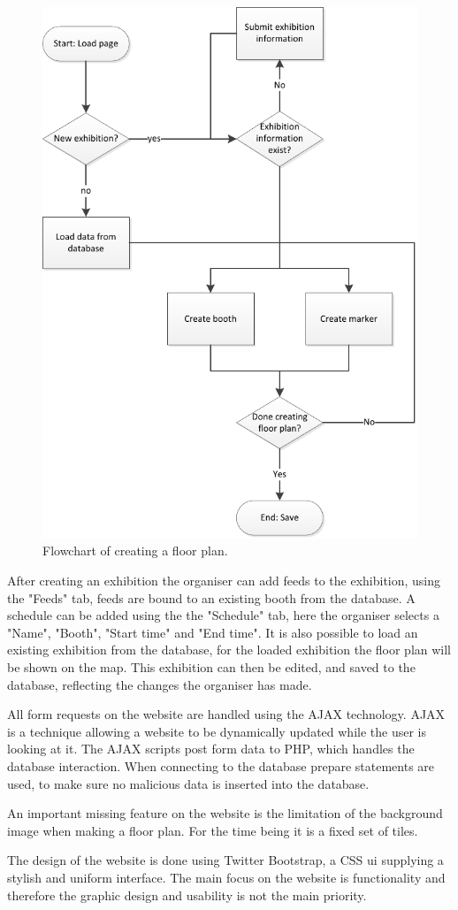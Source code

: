 \begin{figure}[H]
	\centering
	\includegraphics[width=0.7\linewidth]{img/floorplanflow.pdf}
	\caption{Flowchart of creating a floor plan.\label{fig:floorplan}}
\end{figure}

After creating an exhibition the organiser can add feeds to the exhibition, using the "Feeds" tab, feeds are bound to an existing booth from the database. A schedule can be added using the the "Schedule" tab, here the organiser selects a "Name", "Booth", "Start time" and "End time".
It is also possible to load an existing exhibition from the database, for the loaded exhibition the floor plan will be shown on the map. This exhibition can then be edited, and saved to the database, reflecting the changes the organiser has made.

All form requests on the website are handled using the AJAX technology\citep{ajax}. AJAX is a technique allowing a website to be dynamically updated while the user is looking at it. The AJAX scripts post form data to PHP, which handles the database interaction. When connecting to the database prepare statements are used, to make sure no malicious data is inserted into the database.

An important missing feature on the website is the limitation of the background image when making a floor plan. For the time being it is a fixed set of tiles.

The design of the website is done using Twitter Bootstrap\citep{twitterbootstrap}, a CSS \ac{ui} supplying a stylish and uniform interface.
The main focus on the website is functionality and therefore the graphic design and usability is not the main priority.
